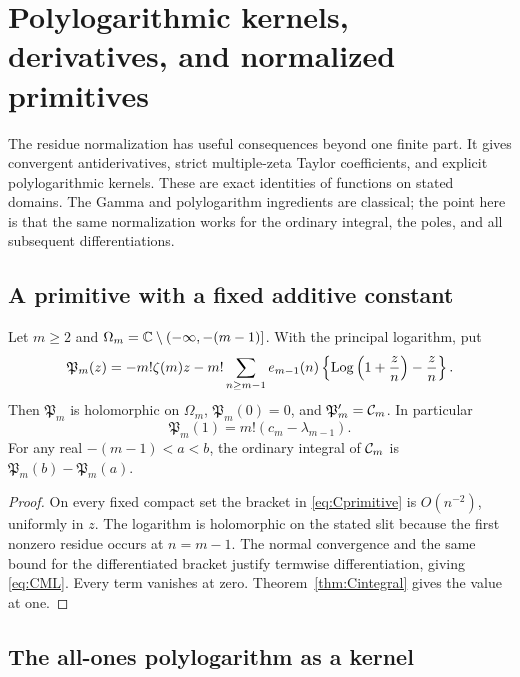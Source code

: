 \section{Polylogarithmic kernels, derivatives, and normalized primitives}
\label{sec:calculus}

The residue normalization has useful consequences beyond one finite
part. It gives convergent antiderivatives, strict multiple-zeta Taylor
coefficients, and explicit polylogarithmic kernels. These are exact
identities of functions on stated domains. The Gamma and polylogarithm
ingredients are classical; the point here is that the same normalization
works for the ordinary integral, the poles, and all subsequent
differentiations.

\subsection{A primitive with a fixed additive constant}

\begin{theorem}
\label{thm:Cprimitive}
Let $m\ge2$ and $\Omega_m=\mathbb C\setminus(-\infty,-(m-1)]$.
With the principal logarithm, put
\begin{equation}\label{eq:Cprimitive}
 \mathfrak P_m(z)=-m!\zeta(m)z
  -m!\sum_{n\ge m-1}e_{m-1}(n)
       \left\{\operatorname{Log}\left(1+\frac zn\right)-\frac zn\right\}.
\end{equation}
Then $\mathfrak P_m$ is holomorphic on $\Omega_m$,
$\mathfrak P_m(0)=0$, and $\mathfrak P_m'=\mathcal C_m$. In particular
\begin{equation}\label{eq:primitive_atone}
 \mathfrak P_m(1)=m!(c_m-\lambda_{m-1}).
\end{equation}
For any real $-(m-1)<a<b$, the ordinary integral of $\mathcal C_m$ is
$\mathfrak P_m(b)-\mathfrak P_m(a)$.
\end{theorem}
\begin{proof}
On every fixed compact set the bracket in \eqref{eq:Cprimitive} is
$O(n^{-2})$, uniformly in $z$. The logarithm is holomorphic on the
stated slit because the first nonzero residue occurs at $n=m-1$.
The normal convergence and the same bound for the differentiated
bracket justify termwise differentiation, giving \eqref{eq:CML}.
Every term vanishes at zero. Theorem~\ref{thm:Cintegral} gives the
value at one.
\end{proof}

\subsection{The all-ones polylogarithm as a kernel}

